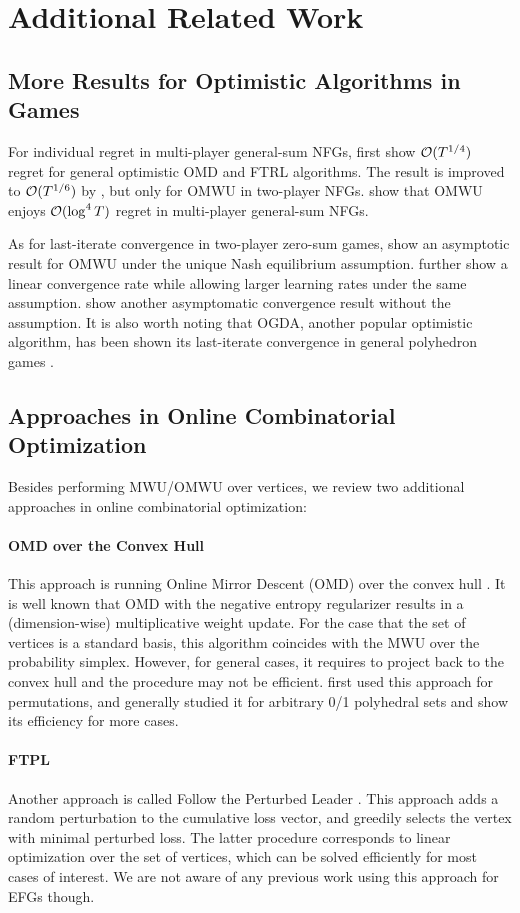 \section{Additional Related Work}\label{app:related works}
\subsection{More Results for Optimistic Algorithms in Games}
For individual regret in multi-player general-sum NFGs, \citet{Syrgkanis15:Fast} first show $\mathcal{O}(T^{1/4})$ regret for general optimistic OMD and FTRL algorithms.
The result is improved to $\mathcal{O}(T^{1/6})$ by \citep{Chen20:Hedging}, but only for OMWU in two-player NFGs.
\citet{Daskalakis21:Near} show that OMWU enjoys $\mathcal{O}(\log^4 T)$ regret in multi-player general-sum NFGs.

As for last-iterate convergence in two-player zero-sum games, \citet{Daskalakis18:Last} show an asymptotic result for OMWU under the unique Nash equilibrium assumption.
\citet{Wei21:Linear} further show a linear convergence rate while allowing larger learning rates under the same assumption.
\citet{Hsieh21:Adaptive} show another asymptomatic convergence result without the assumption.
It is also worth noting that OGDA, another popular optimistic algorithm, has been shown its last-iterate convergence in general polyhedron games \citep{Wei21:Linear}.
\subsection{Approaches in Online Combinatorial Optimization}
Besides performing MWU/OMWU over vertices, we review two additional approaches in online combinatorial optimization:

\paragraph{OMD over the Convex Hull}
This approach is running Online Mirror Descent (OMD) over the convex hull \citep{koolen2010hedging,audibert2014regret}.
It is well known that OMD with the negative entropy regularizer results in a (dimension-wise) multiplicative weight update.
For the case that the set of vertices is a standard basis, this algorithm coincides with the MWU over the probability simplex.
However, for general cases, it requires to project back to the convex hull and the procedure may not be efficient.
\citet{helmbold2009learning} first used this approach for permutations, and \citet{koolen2010hedging} generally studied it for arbitrary 0/1 polyhedral sets and show its efficiency for more cases.

\paragraph{FTPL}
Another approach is called Follow the Perturbed Leader \citep{Kalai05:Efficient}.
This approach adds a random perturbation to the cumulative loss vector, and greedily selects the vertex with minimal perturbed loss.
The latter procedure corresponds to linear optimization over the set of vertices, which can be solved efficiently for most cases of interest.
We are not aware of any previous work using this approach for EFGs though.
